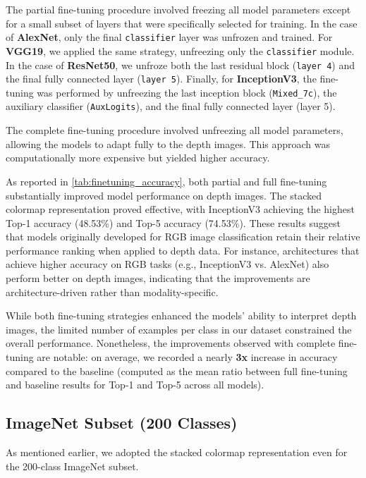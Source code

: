 The partial fine-tuning procedure involved freezing all model parameters except for a small subset of layers that were specifically selected for training. In the case of \textbf{AlexNet}, only the final \texttt{classifier} layer was unfrozen and trained. For \textbf{VGG19}, we applied the same strategy, unfreezing only the \texttt{classifier} module. In the case of \textbf{ResNet50}, we unfroze both the last residual block (\texttt{layer 4}) and the final fully connected layer (\texttt{layer 5}). Finally, for \textbf{InceptionV3}, the fine-tuning was performed by unfreezing the last inception block (\texttt{Mixed\_7c}), the auxiliary classifier (\texttt{AuxLogits}), and the final fully connected layer (layer 5).

The complete fine-tuning procedure involved unfreezing all model parameters, allowing the models to adapt fully to the depth images. This approach was computationally more expensive but yielded higher accuracy.

As reported in \autoref{tab:finetuning_accuracy}, both partial and full fine-tuning substantially improved model performance on depth images. The stacked colormap representation proved effective, with InceptionV3 achieving the highest Top-1 accuracy (48.53\%) and Top-5 accuracy (74.53\%). These results suggest that models originally developed for RGB image classification retain their relative performance ranking when applied to depth data. For instance, architectures that achieve higher accuracy on RGB tasks (e.g., InceptionV3 vs. AlexNet) also perform better on depth images, indicating that the improvements are architecture-driven rather than modality-specific.

While both fine-tuning strategies enhanced the models' ability to interpret depth images, the limited number of examples per class in our dataset constrained the overall performance. Nonetheless, the improvements observed with complete fine-tuning are notable: on average, we recorded a nearly \textbf{3x} increase in accuracy compared to the baseline (computed as the mean ratio between full fine-tuning and baseline results for Top-1 and Top-5 across all models). 

\subsection{ImageNet Subset (200 Classes)}
As mentioned earlier, we adopted the stacked colormap representation even for the 200-class ImageNet subset.

